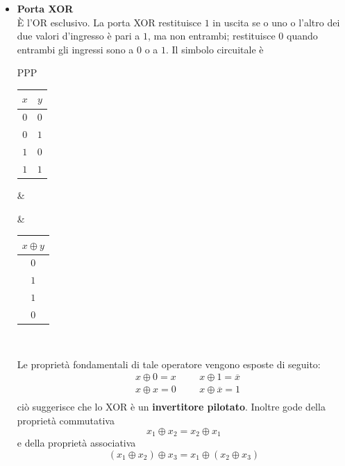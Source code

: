 \documentclass[a4paper]{extarticle}
\begin{document}
\begin{itemize}
    \vspace{1em}
    \noindent
    \item \textbf{Porta XOR}\\
    È l’OR esclusivo. La porta XOR restituisce \(1\) in uscita se o uno o l’altro dei due valori d’ingresso è pari a \(1\), ma non entrambi; restituisce \(0\) quando entrambi gli ingressi sono a \(0\) o a \(1\). Il simbolo circuitale è

    \vspace{1em}
    \noindent
    \begin{tabularx}{\textwidth}{PPP}
    {
        \begin{tabular}{c|c}
             \(x\) & \(y\)\\
             \hline
             $0$ & $0$\\
             $0$ & $1$\\
             $1$ & $0$\\
             $1$ & $1$
        \end{tabular}
    }
    &
    {
    }
    &
    {
        \begin{tabular}{c}
             \(x \oplus y\)\\
             \hline
             $0$\\
             $1$\\
             $1$\\
             $0$
        \end{tabular}
    }\\
    \end{tabularx}
    \vspace{1em}
    \noindent
    Le proprietà fondamentali di tale operatore vengono esposte di seguito:
    \begin{align*}
        &x \oplus 0 = x && &x \oplus 1 =\overline{x}\\
        &x \oplus x = 0 && &x \oplus \overline{x}=1\\
    \end{align*}
    ciò suggerisce che lo XOR è un \textbf{invertitore pilotato}. Inoltre gode della proprietà commutativa
    \[x_1 \oplus x_2 = x_2 \oplus x_1\]
    e della proprietà associativa
    \[(x_1 \oplus x_2) \oplus x_3 = x_1 \oplus (x_2 \oplus x_3)\]
\end{itemize}
\end{document}
